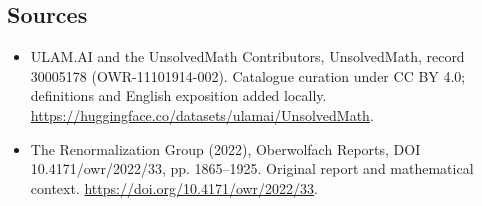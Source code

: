 \documentclass[11pt]{article}
\begin{document}
\subsection{Sources}
\begin{itemize}
\item[\hypertarget{source:30005178:1}{S1}] ULAM.AI and the UnsolvedMath Contributors, UnsolvedMath, record 30005178 (OWR-11101914-002). Catalogue curation under CC BY 4.0; definitions and English exposition added locally.
\url{https://huggingface.co/datasets/ulamai/UnsolvedMath}.
\item[\hypertarget{source:30005178:2}{S2}] The Renormalization Group (2022), Oberwolfach Reports, DOI 10.4171/owr/2022/33, pp. 1865--1925. Original report and mathematical context.
\url{https://doi.org/10.4171/owr/2022/33}.
\end{itemize}
\label{end:30005178}
\end{document}
